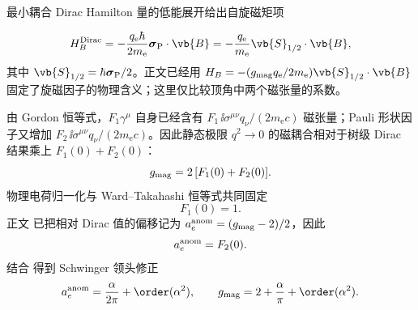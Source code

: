 \begin{derivation}
最小耦合 Dirac Hamilton 量的低能展开给出自旋磁矩项

\begin{equation*}
 H_{B}^{\rm Dirac}
 =-\frac{q_{\mathrm e}\hbar}{2m_{\mathrm e}}\boldsymbol\sigma_{\rm P}\cdot\vb{B}
 =-\frac{q_{\mathrm e}}{m_{\mathrm e}}\vb{S}_{1/2}\cdot\vb{B},
\end{equation*}
其中 $\vb{S}_{1/2}=\hbar\boldsymbol\sigma_{\rm P}/2$。正文已经用
$H_B=-(g_{\rm mag}q_{\mathrm e}/2m_{\mathrm e})\vb{S}_{1/2}\cdot\vb{B}$ 固定了旋磁因子的物理含义；这里仅比较顶角中两个磁张量的系数。

由 Gordon 恒等式，$F_1\gamma^\mu$ 自身已经含有
$F_1\,\ii\sigma^{\mu\nu}q_\nu/(2m_{\mathrm e} c)$ 磁张量；Pauli 形状因子又增加
$F_2\,\ii\sigma^{\mu\nu}q_\nu/(2m_{\mathrm e} c)$。因此静态极限 $q^2\to0$ 的磁耦合相对于树级 Dirac 结果乘上
$F_1(0)+F_2(0)$：
\begin{equation*}
 {
 g_{\rm mag}=2\,[F_1(0)+F_2(0)].}
 \end{equation*}
物理电荷归一化与 Ward--Takahashi 恒等式共同固定
\begin{equation*}
 F_1(0)=1.
\end{equation*}
正文 已把相对 Dirac 值的偏移记为 $a_e^{\rm anom}=(g_{\rm mag}-2)/2$，因此
\begin{equation*}
 a_e^{\rm anom}=F_2(0).
\end{equation*}
结合  得到 Schwinger 领头修正
\begin{equation*}
 {
 a_e^{\rm anom}
 =\frac{\alpha}{2\pi}+\order(\alpha^2),
 \qquad
 g_{\rm mag}
 =2+\frac{\alpha}{\pi}+\order(\alpha^2).}
 \end{equation*}
\end{derivation}

